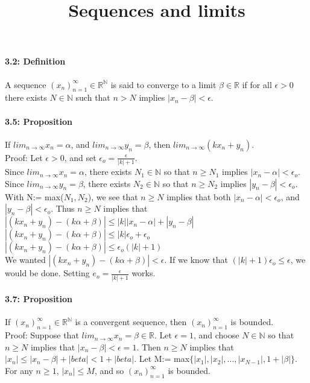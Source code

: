 \documentclass[10pt,letter]{article}
\begin{document}
\title{Sequences and limits}

\paragraph{3.2: Definition}
A sequence $(x_n)_{n=1}^\infty \in \mathbb{R}^\mathbb{N}$ is said to converge to a limit $\beta \in \mathbb{R}$ if for all $\epsilon > 0$ there exists $N \in \mathbb{N}$ such that $n > N$ implies $|x_n - \beta| < \epsilon$. 

\paragraph{3.5: Proposition}
If $lim_{n\rightarrow\infty}x_n = \alpha$, and $lim_{n\rightarrow\infty}y_n = \beta$, then $lim_{n\rightarrow\infty}(kx_n + y_n)$.\\ 
Proof: Let $\epsilon > 0$, and set $\epsilon_o = \frac{\epsilon}{|k|+1}$.\\ 
Since $lim_{n\rightarrow\infty}x_n = \alpha$, there exists $N_1 \in \mathbb{N}$ so that $n\geq N_1$ implies $|x_n - \alpha| < \epsilon_o$. \\ 
Since $lim_{n\rightarrow\infty}y_n = \beta$, there exists $N_2 \in \mathbb{N}$ so that $n\geq N_2$ implies $|y_n - \beta| < \epsilon_o$. \\ 
With N:= max($N_1, N_2$), we see that $n \geq N$ implies that both $|x_n - \alpha| < \epsilon_o$, and $|y_n - \beta| < \epsilon_o$. Thus $n \geq N$ implies that \\ 
$|(kx_n+y_n) - (k\alpha+\beta)| \leq |k||x_n - \alpha|+|y_n - \beta|$\\
$|(kx_n+y_n) - (k\alpha+\beta)| \leq |k|\epsilon_o +\epsilon_o$\\
$|(kx_n+y_n) - (k\alpha+\beta)| \leq \epsilon_o(|k|+1)$\\ 
We wanted $|(kx_n+y_n)-(k\alpha+\beta)| < \epsilon$. If we know that $(|k|+1)\epsilon_o \leq \epsilon$, we would be done. Setting $e_o = \frac{\epsilon}{|k|+1}$ works. 


\paragraph{3.7: Proposition}
If $(x_n)_{n=1}^\infty \in \mathbb{R}^\mathbb{N}$ is a convergent sequence, then $(x_n)_{n=1}^\infty$ is bounded.\\ 
Proof: Suppose that $lim_{n\rightarrow\infty}x_n = \beta \in \mathbb{R}$. Let $\epsilon = 1$, and choose $N \in \mathbb{N}$ so that $n \geq N$ implies that $|x_n - \beta| < \epsilon = 1$. Then $n \geq N$ implies that $|x_n| \leq |x_n - \beta| + |beta| < 1 + |beta|$. Let M:= max$\{|x_1|, |x_2|, ... ,|x_{N-1}|, 1 + |\beta|\}$. For any $n\geq 1$, $|x_n| \leq M$, and so $(x_n)_{n=1}^\infty$ is bounded. 
\end{document}
